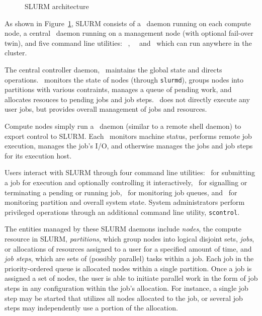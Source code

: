 \documentclass[10pt,onecolumn,times]{../common/llncs}
\begin{document}
{\begin{figure}[tb]
\centerline{}
\caption{\small SLURM architecture}
\label{arch}
\end{figure}

As shown in Figure~\ref{arch}, SLURM consists of a \slurmd\ daemon
running on each compute node, a central \slurmctld\ daemon running
on a management node (with optional fail-over twin), and five command
line utilities: \srun\, \scancel, \sinfo\, \squeue\, and \scontrol\, 
which can run anywhere in the cluster.

The central controller daemon, \slurmctld\, maintains the global
state and directs operations.
\slurmctld\ monitors the state of nodes (through {\tt slurmd}),
groups nodes into partitions with various contraints,  
manages a queue of pending work, and
allocates resouces to pending jobs and job steps.
\slurmctld\ does not directly execute any user jobs, but 
provides overall management of jobs and resources.
  
Compute nodes simply run a \slurmd\ daemon (similar to a remote 
shell daemon) to export control to SLURM.
Each \slurmd\ monitors machine status, 
performs remote job execution, manages the job's I/O, and otherwise 
manages the jobs and job steps for its execution host.

Users interact with SLURM through four command line utilities: 
\srun\ for submitting a job for execution and optionally controlling 
it interactively, 
\scancel\ for signalling or terminating a pending or running job,
\squeue\ for monitoring job queues, and 
\sinfo\ for monitoring partition and overall system state.  
System administrators perform privileged operations through an 
additional command line utility, {\tt scontrol}.

The entities managed by these SLURM daemons include {\em nodes}, the
compute resource in SLURM, {\em partitions}, which group nodes into
logical disjoint sets, {\em jobs}, or allocations of resources assigned
to a user for a specified amount of time, and {\em job steps}, which
are sets of (possibly parallel) tasks within a job.  Each job in the
priority-ordered queue is allocated nodes within a single partition.
Once a job is assigned a set of nodes, the user is able to initiate 
parallel work in the form of job steps in any configuration within 
the job's allocation. 
For instance, a single job step may be started that utilizes all nodes
allocated to the job, or several job steps may independently use a
portion of the allocation.

}
\end{document}
